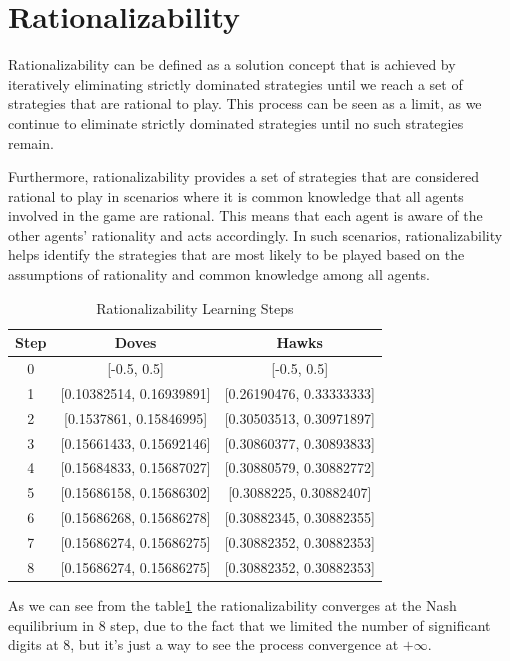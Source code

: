 \documentclass[12pt]{article}
\begin{document}
\section{Rationalizability}

Rationalizability can be defined as a solution concept that is achieved by iteratively eliminating strictly dominated strategies until we reach a set of strategies that are rational to play. This process can be seen as a limit, as we continue to eliminate strictly dominated strategies until no such strategies remain.

Furthermore, rationalizability provides a set of strategies that are considered rational to play in scenarios where it is common knowledge that all agents involved in the game are rational. This means that each agent is aware of the other agents' rationality and acts accordingly. In such scenarios, rationalizability helps identify the strategies that are most likely to be played based on the assumptions of rationality and common knowledge among all agents.

\begin{table}[htbp]
    \centering
    \caption{Rationalizability Learning Steps}
    \label{table1}
    \begin{tabular}{|c|c|c|}
    \hline
    \textbf{Step} & \textbf{Doves} & \textbf{Hawks} \\ \hline
    0             & [-0.5, 0.5]      & [-0.5, 0.5]      \\ 
    1             & [0.10382514, 0.16939891]     & [0.26190476, 0.33333333]     \\ 
    2             & [0.1537861, 0.15846995]     & [0.30503513, 0.30971897]     \\ 
    3             & [0.15661433, 0.15692146]     & [0.30860377, 0.30893833]     \\ 
    4             & [0.15684833, 0.15687027]     & [0.30880579, 0.30882772]     \\ 
    5             & [0.15686158, 0.15686302]     & [0.3088225, 0.30882407]     \\ 
    6             & [0.15686268, 0.15686278]     & [0.30882345, 0.30882355]\\
    7             & [0.15686274, 0.15686275]     & [0.30882352, 0.30882353]\\
    8             & [0.15686274, 0.15686275]     & [0.30882352, 0.30882353]     \\ \hline
    \end{tabular}
    \end{table}

As we can see from the table\ref{table1} the rationalizability converges at the Nash equilibrium in 8 step, due to the
fact 
that we limited the number of significant digits at 8,
 but it's just a way to see the process convergence at $+ \infty$. 
\end{document}
